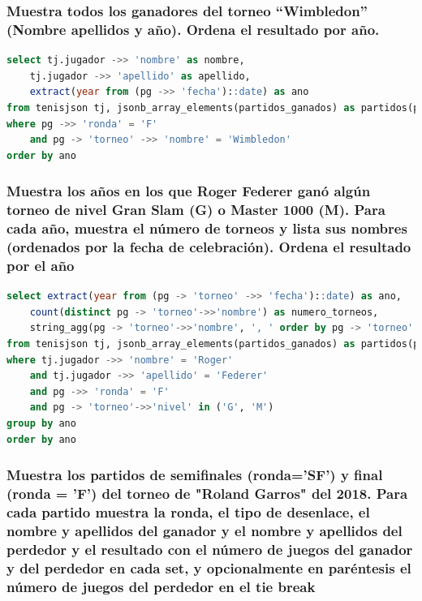 \documentclass[10pt]{opticajnl}
\begin{document}
\subsubsection{Muestra todos los ganadores del torneo ``Wimbledon'' (Nombre apellidos y año). Ordena el resultado por año.}

\begin{lstlisting}[language=SQL]
select tj.jugador ->> 'nombre' as nombre, 
    tj.jugador ->> 'apellido' as apellido, 
    extract(year from (pg ->> 'fecha')::date) as ano
from tenisjson tj, jsonb_array_elements(partidos_ganados) as partidos(pg)
where pg ->> 'ronda' = 'F' 
    and pg -> 'torneo' ->> 'nombre' = 'Wimbledon'
order by ano
\end{lstlisting}





\subsubsection{Muestra los años en los que Roger Federer ganó algún torneo de nivel Gran Slam (G) o Master 1000 (M). Para cada año, muestra el número de torneos y lista sus nombres (ordenados por la fecha de celebración). Ordena el resultado por el año}

\begin{lstlisting}[language=SQL]
select extract(year from (pg -> 'torneo' ->> 'fecha')::date) as ano,
    count(distinct pg -> 'torneo'->>'nombre') as numero_torneos,
    string_agg(pg -> 'torneo'->>'nombre', ', ' order by pg -> 'torneo' ->> 'fecha') as torneos
from tenisjson tj, jsonb_array_elements(partidos_ganados) as partidos(pg)
where tj.jugador ->> 'nombre' = 'Roger'
    and tj.jugador ->> 'apellido' = 'Federer'
    and pg ->> 'ronda' = 'F'
    and pg -> 'torneo'->>'nivel' in ('G', 'M')
group by ano
order by ano
\end{lstlisting}





\subsubsection{Muestra los partidos de semiﬁnales (ronda='SF') y ﬁnal (ronda = 'F') del torneo de "Roland Garros" del 2018. Para cada partido muestra la ronda, el tipo de desenlace, el nombre y apellidos del ganador y el nombre y apellidos del perdedor y el resultado con el número de juegos del ganador y del perdedor en cada set, y opcionalmente en paréntesis el número de juegos del perdedor en el tie break}
\end{document}
